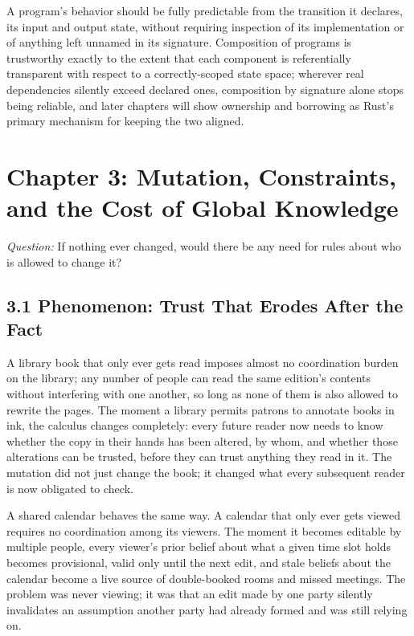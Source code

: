 \documentclass[11pt]{book}
\begin{document}
\begin{invariantbox}
A program's behavior should be fully predictable from the transition it declares, its input and output state, without requiring inspection of its implementation or of anything left unnamed in its signature. Composition of programs is trustworthy exactly to the extent that each component is referentially transparent with respect to a correctly-scoped state space; wherever real dependencies silently exceed declared ones, composition by signature alone stops being reliable, and later chapters will show ownership and borrowing as Rust's primary mechanism for keeping the two aligned.
\end{invariantbox}

\clearpage

\chapter*{Chapter 3: Mutation, Constraints, and the Cost of Global Knowledge}

\begin{firstprinciples}
\textit{Question:} If nothing ever changed, would there be any need for rules about who is allowed to change it?
\end{firstprinciples}

\section*{3.1 Phenomenon: Trust That Erodes After the Fact}

A library book that only ever gets read imposes almost no coordination burden on the library; any number of people can read the same edition's contents without interfering with one another, so long as none of them is also allowed to rewrite the pages. The moment a library permits patrons to annotate books in ink, the calculus changes completely: every future reader now needs to know whether the copy in their hands has been altered, by whom, and whether those alterations can be trusted, before they can trust anything they read in it. The mutation did not just change the book; it changed what every subsequent reader is now obligated to check.

A shared calendar behaves the same way. A calendar that only ever gets viewed requires no coordination among its viewers. The moment it becomes editable by multiple people, every viewer's prior belief about what a given time slot holds becomes provisional, valid only until the next edit, and stale beliefs about the calendar become a live source of double-booked rooms and missed meetings. The problem was never viewing; it was that an edit made by one party silently invalidates an assumption another party had already formed and was still relying on.
\end{document}
